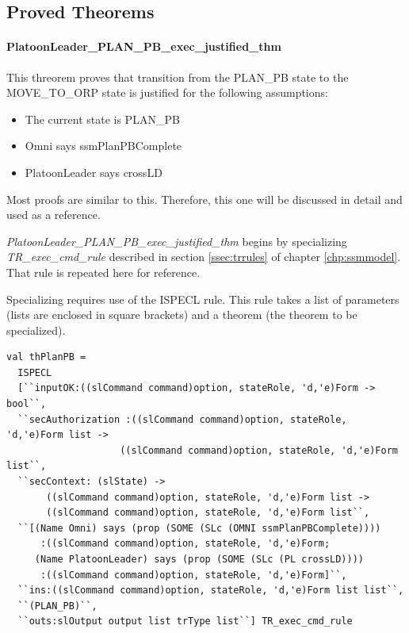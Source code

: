 \documentclass[../../main/main.tex]{subfiles}
\begin{document}
\HOLPBIntegratedDefDefinitionssecAuthorizationXXdef

\HOLPBIntegratedDefDefinitionssecHelperXXdef


\subsection{Proved Theorems}\label{ssec:ssmpbproved}

\paragraph*{PlatoonLeader_PLAN_PB_exec_justified_thm}
This threorem proves that transition from the PLAN_PB state to the MOVE_TO_ORP state is justified for the following assumptions:
\begin{itemize}
\item The current state is PLAN_PB
\item Omni says ssmPlanPBComplete
\item PlatoonLeader says crossLD
\end{itemize}

Most proofs are similar to this.  Therefore, this one will be discussed in detail and used as a reference.

\textit{PlatoonLeader_PLAN_PB_exec_justified_thm} begins by specializing \textit{TR_exec_cmd_rule} described in section \ref{ssec:trrules} of chapter \ref{chp:ssmmodel}.  That rule is repeated here for reference.

\HOLssmTheoremsTRXXexecXXcmdXXrule

Specializing requires use of the ISPECL rule.  This rule takes a list of parameters (lists are enclosed in square brackets) and a theorem (the theorem to be specialized).  

\begin{lstlisting}
val thPlanPB =
  ISPECL
  [``inputOK:((slCommand command)option, stateRole, 'd,'e)Form -> bool``,
  ``secAuthorization :((slCommand command)option, stateRole, 'd,'e)Form list ->
                    ((slCommand command)option, stateRole, 'd,'e)Form list``,
  ``secContext: (slState) ->
       ((slCommand command)option, stateRole, 'd,'e)Form list ->
       ((slCommand command)option, stateRole, 'd,'e)Form list``,
  ``[(Name Omni) says (prop (SOME (SLc (OMNI ssmPlanPBComplete))))
      :((slCommand command)option, stateRole, 'd,'e)Form;
     (Name PlatoonLeader) says (prop (SOME (SLc (PL crossLD))))
      :((slCommand command)option, stateRole, 'd,'e)Form]``,
  ``ins:((slCommand command)option, stateRole, 'd,'e)Form list list``,
  ``(PLAN_PB)``,
  ``outs:slOutput output list trType list``] TR_exec_cmd_rule
\end{lstlisting}
\end{document}
